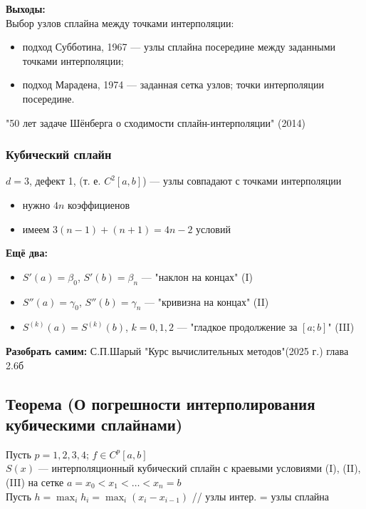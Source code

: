 \textbf{Выходы:} \\
Выбор узлов сплайна между точками интерполяции:
\begin{itemize}
    \item подход Субботина, 1967 --- узлы сплайна посередине между заданными точками интерполяции;
    \item подход Марадена, 1974 --- заданная сетка узлов; точки интерполяции посередине.
\end{itemize}

"50 лет задаче Шёнберга о сходимости сплайн-интерполяции" (2014)

\subsubsection*{Кубический сплайн}

$d = 3$, дефект 1, (т. е. $C^2[a, b]$) --- узлы совпадают с точками интерполяции

\begin{itemize}
    \item нужно $4n$ коэффициенов
    \item имеем $3(n - 1) + (n + 1) = 4n - 2$ условий
\end{itemize}

\textbf{Ещё два:}

\begin{itemize}
    \item $S'(a) = \beta_0$, $S'(b) = \beta_n$ --- "наклон на концах" (I)
    \item $S''(a) = \gamma_0$, $S''(b) = \gamma_n$ --- "кривизна на концах" (II)
    \item $S^{(k)}(a) = S^{(k)}(b)$, $k = 0, 1, 2$ --- "гладкое продолжение за $[a;b]$" (III)
\end{itemize}

\textbf{Разобрать самим:} С.П.Шарый "Курс вычислительных методов"(2025 г.) глава 2.6б

\subsection*{Теорема (О погрешности интерполирования кубическими сплайнами)}
Пусть $p = 1, 2, 3, 4$; $f \in C^p[a, b]$ \\
$S(x)$ — интерполяционный кубический сплайн с краевыми условиями (I), (II), (III) на сетке $a = x_0 < x_1 < \ldots < x_n = b$ \\
Пусть $h = \max_i h_i = \max_i (x_i - x_{i-1})$ \quad // узлы интер. = узлы сплайна

